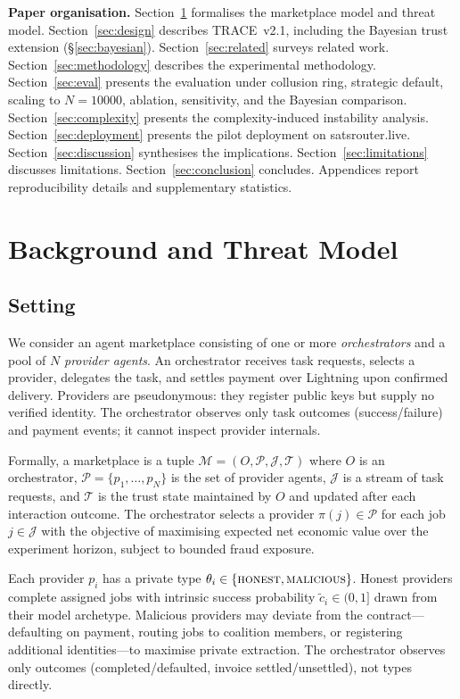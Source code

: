 \documentclass[sigconf,nonacm,10pt]{acmart}
\begin{document}
\noindent\textbf{Paper organisation.}
Section~\ref{sec:background} formalises the marketplace model and
threat model. Section~\ref{sec:design} describes TRACE~v2.1,
including the Bayesian trust extension (\S\ref{sec:bayesian}).
Section~\ref{sec:related} surveys related work.
Section~\ref{sec:methodology} describes the experimental
methodology. Section~\ref{sec:eval} presents the evaluation under
collusion ring, strategic default, scaling to $N{=}10000$,
ablation, sensitivity, and the Bayesian comparison.
Section~\ref{sec:complexity} presents the complexity-induced
instability analysis. Section~\ref{sec:deployment} presents the
pilot deployment on satsrouter.live.
Section~\ref{sec:discussion} synthesises the implications.
Section~\ref{sec:limitations} discusses limitations.
Section~\ref{sec:conclusion} concludes. Appendices report
reproducibility details and supplementary statistics.

\section{Background and Threat Model}
\label{sec:background}

\subsection{Setting}

We consider an agent marketplace consisting of one or more
\emph{orchestrators} and a pool of $N$ \emph{provider agents}. An
orchestrator receives task requests, selects a provider, delegates
the task, and settles payment over Lightning upon confirmed
delivery. Providers are pseudonymous: they register public keys
but supply no verified identity. The orchestrator observes only
task outcomes (success/failure) and payment events; it cannot
inspect provider internals.

Formally, a marketplace is a tuple $\mathcal{M} = (O, \mathcal{P},
\mathcal{J}, \mathcal{T})$ where $O$ is an orchestrator,
$\mathcal{P} = \{p_1, \ldots, p_N\}$ is the set of provider agents,
$\mathcal{J}$ is a stream of task requests, and $\mathcal{T}$ is
the trust state maintained by $O$ and updated after each
interaction outcome. The orchestrator selects a provider
$\pi(j)\in\mathcal{P}$ for each job $j\in\mathcal{J}$ with the
objective of maximising expected net economic value over the
experiment horizon, subject to bounded fraud exposure.

Each provider $p_i$ has a private type
$\theta_i \in \{\textsc{honest}, \textsc{malicious}\}$. Honest
providers complete assigned jobs with intrinsic success
probability $\tilde{c}_i \in (0,1]$ drawn from their model
archetype. Malicious providers may deviate from the contract---
defaulting on payment, routing jobs to coalition members, or
registering additional identities---to maximise private extraction.
The orchestrator observes only outcomes (completed/defaulted,
invoice settled/unsettled), not types directly.
\end{document}
